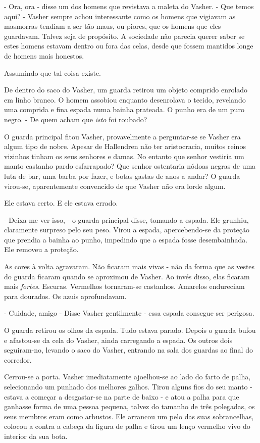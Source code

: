 \documentclass[11pt,a4paper]{book}
\begin{document}
- Ora, ora - disse um dos homens que revistava a maleta do Vasher. - Que temos aqui? - Vasher sempre achou interessante como os homens que vigiavam as masmorras tendiam a ser tão maus, ou piores, que os homens que eles guardavam. Talvez seja de propósito. A sociedade não parecia querer saber se estes homens estavam dentro ou fora das celas, desde que fossem mantidos longe de homens mais honestos.

Assumindo que tal coisa existe.

De dentro do saco do Vasher, um guarda retirou um objeto comprido enrolado em linho branco. O homem assobiou enquanto desenrolava o tecido, revelando uma comprida e fina espada numa bainha prateada. O punho era de um puro negro. 
- De quem acham que \textit{isto} foi roubado?
 
O guarda principal fitou Vasher, provavelmente a perguntar-se se Vasher era algum tipo de nobre. Apesar de Hallendren não ter aristocracia, muitos reinos vizinhos tinham os seus senhores e damas. No entanto que senhor vestiria um manto castanho pardo esfarrapado? Que senhor ostentaria nódoas negras de uma luta de bar, uma barba por fazer, e botas gastas de anos a andar? O guarda virou-se, aparentemente convencido de que Vasher não era lorde algum.

Ele estava certo. E ele estava errado.

- Deixa-me ver isso, - o guarda principal disse, tomando a espada. Ele grunhiu, claramente surpreso pelo seu peso. Virou a espada, apercebendo-se da proteção que prendia a bainha ao punho, impedindo que a espada fosse desembainhada. Ele removeu a proteção.

As cores à volta agravaram. Não ficaram mais vivas - não da forma que as vestes do guarda ficaram quando se aproximou de Vasher. Ao invés disso, elas ficaram mais \textit{fortes}. Escuras. Vermelhos tornaram-se castanhos. Amarelos endureciam para dourados. Os azuis aprofundavam.

- Cuidade, amigo - Disse Vasher gentilmente - essa espada consegue ser perigosa.

O guarda retirou os olhos da espada. Tudo estava parado. Depois o guarda bufou e afastou-se da cela do Vasher, ainda carregando a espada. Os outros dois seguiram-no, levando o saco do Vasher, entrando na sala dos guardas ao final do corredor. 

Cerrou-se a porta. Vasher imediatamente ajoelhou-se ao lado do farto de palha, selecionando um punhado dos melhores galhos. Tirou alguns fios do seu manto - estava a começar a desgastar-se na parte de baixo - e atou a palha para que ganhasse forma de uma pessoa pequena, talvez do tamanho de três polegadas, os seus membros eram como arbustos. Ele arrancou um pelo das suas sobrancelhas, colocou a contra a cabeça da figura de palha e tirou um lenço vermelho vivo do interior da sua bota.
\end{document}
